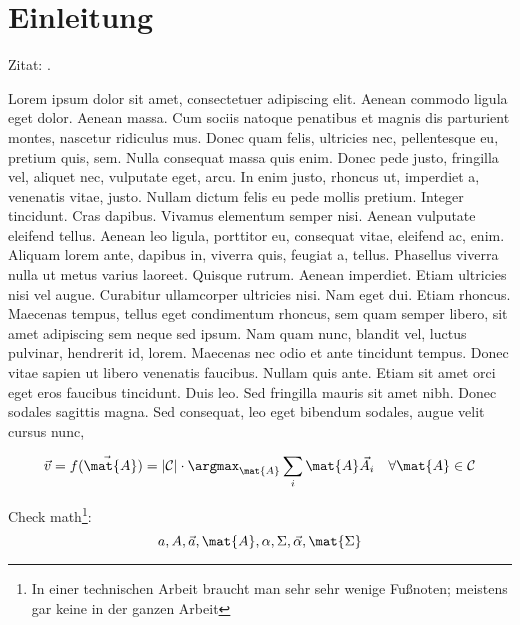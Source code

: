 \chapter{Einleitung}

Zitat: \cite{Bronstein08:TDM,LongURL}.

Lorem ipsum dolor sit amet, consectetuer adipiscing elit. Aenean commodo ligula 
eget dolor. Aenean massa. Cum sociis natoque penatibus et magnis dis parturient 
montes, nascetur ridiculus mus. Donec quam felis, ultricies nec, pellentesque 
eu, pretium quis, sem. Nulla consequat massa quis enim. Donec pede justo, 
fringilla vel, aliquet nec, vulputate eget, arcu. In enim justo, rhoncus ut, 
imperdiet a, venenatis vitae, justo. Nullam dictum felis eu pede mollis pretium. 
Integer tincidunt. Cras dapibus. Vivamus elementum semper nisi. Aenean vulputate 
eleifend tellus. Aenean leo ligula, porttitor eu, consequat vitae, eleifend ac, 
enim. Aliquam lorem ante, dapibus in, viverra quis, feugiat a, tellus. Phasellus 
viverra nulla ut metus varius laoreet. Quisque rutrum. Aenean imperdiet. Etiam 
ultricies nisi vel augue. Curabitur ullamcorper ultricies nisi. Nam eget dui. 
Etiam rhoncus. Maecenas tempus, tellus eget condimentum rhoncus, sem quam semper 
libero, sit amet adipiscing sem neque sed ipsum. Nam quam nunc, blandit vel, 
luctus pulvinar, hendrerit id, lorem. Maecenas nec odio et ante tincidunt 
tempus. Donec vitae sapien ut libero venenatis faucibus. Nullam quis ante. Etiam 
sit amet orci eget eros faucibus tincidunt. Duis leo. Sed fringilla mauris sit 
amet nibh. Donec sodales sagittis magna. Sed consequat, leo eget bibendum 
sodales, augue velit cursus nunc, 

\begin{equation}
\vec{v} = \vec{f(\mat{A})} = |{\cal C}| \cdot \argmax_{\mat{A}}  \sum_i{\mat{A}\vec{A}_i}
\quad\forall\mat{A}\in{\cal C}
\end{equation}

Check math\footnote{In einer technischen Arbeit braucht man sehr sehr wenige Fußnoten; meistens gar keine in der ganzen Arbeit}:
%
\begin{equation}
a, A, \vec{a}, \mat{A}, \alpha, \Sigma, \vec{\alpha}, \mat{\Sigma}
\end{equation}

